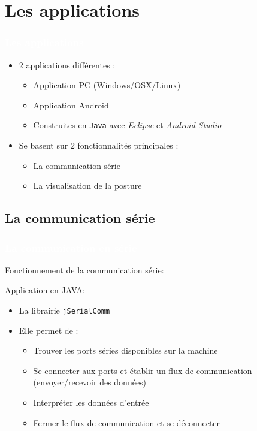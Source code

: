 \documentclass{beamer}
\begin{document}
\section{Les applications}
\begin{frame}
\frametitle{\textcolor{white}{Les applications}}
\begin{itemize}
\item 2 applications différentes :
\begin{itemize}
\item Application PC (Windows/OSX/Linux)
\item Application Android
\item Construites en \texttt{Java} avec \textit{Eclipse} et \textit{Android Studio}
\end{itemize}
\item Se basent sur 2 fonctionnalités principales :
\begin{itemize}
\item La communication série
\item La visualisation de la posture
\end{itemize}
\end{itemize}

\end{frame}

\subsection{La communication série}
\begin{frame}
\frametitle{\textcolor{white}{La communication en série}}
Fonctionnement de la communication série:


Application en JAVA:
\begin{itemize}
\item La librairie \texttt{jSerialComm}
\item Elle permet de :
\begin{itemize}
\item Trouver les ports séries disponibles sur la machine
\item Se connecter aux ports et établir un flux de communication (envoyer/recevoir des données)
\item Interpréter les données d'entrée
\item Fermer le flux de communication et se déconnecter
\end{itemize}
\end{itemize}
\end{frame}
\end{document}
